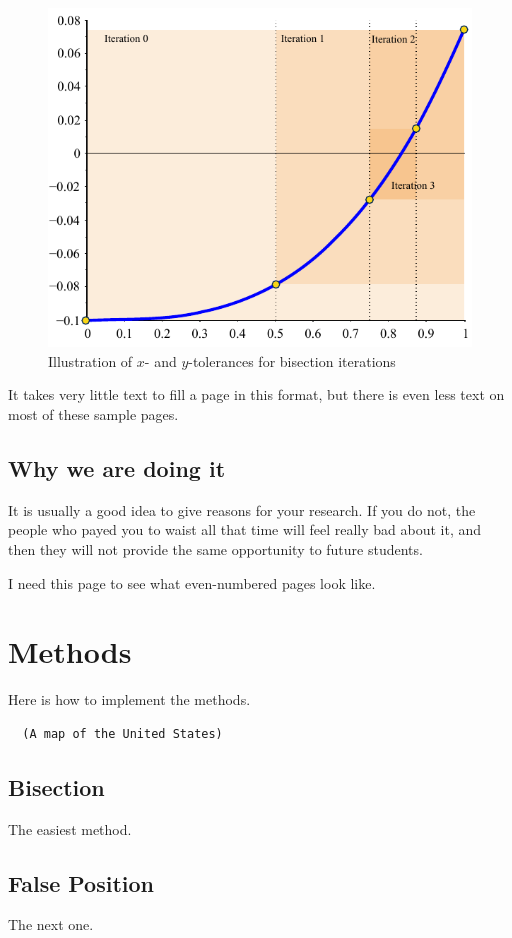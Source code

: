 \documentclass[thesis]{./tex/thesis-umich}
\begin{document}
\begin{figure}
 \begin{center}
  \includegraphics[scale=1]{./pics/f1_tol.pdf}
 \end{center}
 \caption{ \label{fig:fn:tol}
  Illustration of $x$- and $y$-tolerances for bisection iterations}
\end{figure}

\newpage

It takes very little text to fill a page in this format, but there is even less text on most of these sample pages.

\section{Why we are doing it}
It is usually a good idea to give reasons for your research.  If you do not, the people who payed you to waist all that time will feel really bad about it, and then they will not provide the same opportunity to future students.

\newpage

I need this page to see what even-numbered pages look like.

\appendix
\chapter{Methods}
Here is how to implement the methods.

\begin{program}
 \begin{verbatim}
  (A map of the United States)
 \end{verbatim}
 \caption{Map of the United States}
\end{program}

\section{Bisection}
The easiest method.

\section{False Position}
The next one.



\end{document}
